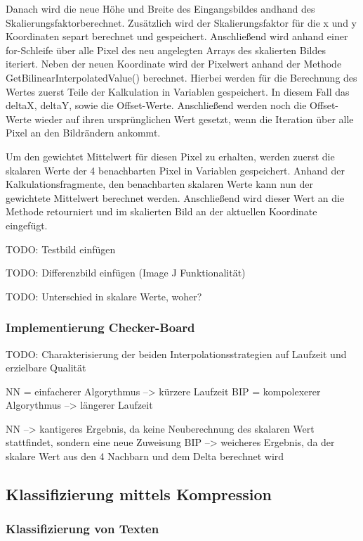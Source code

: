 \documentclass[12pt,german]{article}
\begin{document}
Danach wird die neue Höhe und Breite des Eingangsbildes andhand des Skalierungsfaktorberechnet. Zusätzlich wird der Skalierungsfaktor für die x und y Koordinaten separt berechnet und gespeichert. Anschließend wird anhand einer for-Schleife über alle Pixel des neu angelegten Arrays des skalierten Bildes iteriert. Neben der neuen Koordinate wird der Pixelwert anhand der Methode GetBilinearInterpolatedValue() berechnet. Hierbei werden für die Berechnung des Wertes zuerst Teile der Kalkulation in Variablen gespeichert. In diesem Fall das deltaX, deltaY, sowie die Offset-Werte. Anschließend werden noch die Offset-Werte wieder auf ihren ursprünglichen Wert gesetzt, wenn die Iteration über alle Pixel an den Bildrändern ankommt. 


Um den gewichtet Mittelwert für diesen Pixel zu erhalten, werden zuerst die skalaren Werte der 4 benachbarten Pixel in Variablen gespeichert. Anhand der Kalkulationsfragmente, den benachbarten skalaren Werte kann nun der gewichtete Mittelwert berechnet werden. Anschließend wird dieser Wert an die Methode retourniert und im skalierten Bild an der aktuellen Koordinate eingefügt.

TODO: Testbild einfügen

TODO: Differenzbild einfügen (Image J Funktionalität)

TODO: Unterschied in skalare Werte, woher? \\




\subsubsection{Implementierung Checker-Board}
TODO: Charakterisierung der beiden Interpolationsstrategien auf Laufzeit und erzielbare Qualität

 NN = einfacherer Algorythmus --> kürzere Laufzeit
BIP = kompolexerer Algorythmus --> längerer Laufzeit

NN --> kantigeres Ergebnis, da keine Neuberechnung des skalaren Wert stattfindet, sondern eine neue Zuweisung
BIP --> weicheres Ergebnis, da der skalare Wert aus den 4 Nachbarn und dem Delta berechnet wird


\subsection{Klassifizierung mittels Kompression}
\subsubsection{Klassifizierung von Texten}
\end{document}
